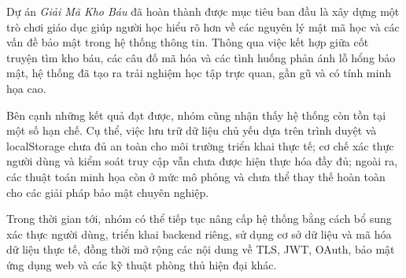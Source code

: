 
Dự án \textit{Giải Mã Kho Báu} đã hoàn thành được mục tiêu ban đầu là xây dựng một trò chơi giáo dục giúp người học hiểu rõ hơn về các nguyên lý mật mã học và các vấn đề bảo mật trong hệ thống thông tin. Thông qua việc kết hợp giữa cốt truyện tìm kho báu, các câu đố mã hóa và các tình huống phản ánh lỗ hổng bảo mật, hệ thống đã tạo ra trải nghiệm học tập trực quan, gần gũ và có tính minh họa cao.

Bên cạnh những kết quả đạt được, nhóm cũng nhận thấy hệ thống còn tồn tại một số hạn chế. Cụ thể, việc lưu trữ dữ liệu chủ yếu dựa trên trình duyệt và localStorage chưa đủ an toàn cho môi trường triển khai thực tế; cơ chế xác thực người dùng và kiểm soát truy cập vẫn chưa được hiện thực hóa đầy đủ; ngoài ra, các thuật toán minh họa còn ở mức mô phỏng và chưa thể thay thế hoàn toàn cho các giải pháp bảo mật chuyên nghiệp.

Trong thời gian tới, nhóm có thể tiếp tục nâng cấp hệ thống bằng cách bổ sung xác thực người dùng, triển khai backend riêng, sử dụng cơ sở dữ liệu và mã hóa dữ liệu thực tế, đồng thời mở rộng các nội dung về TLS, JWT, OAuth, bảo mật ứng dụng web và các kỹ thuật phòng thủ hiện đại khác.
